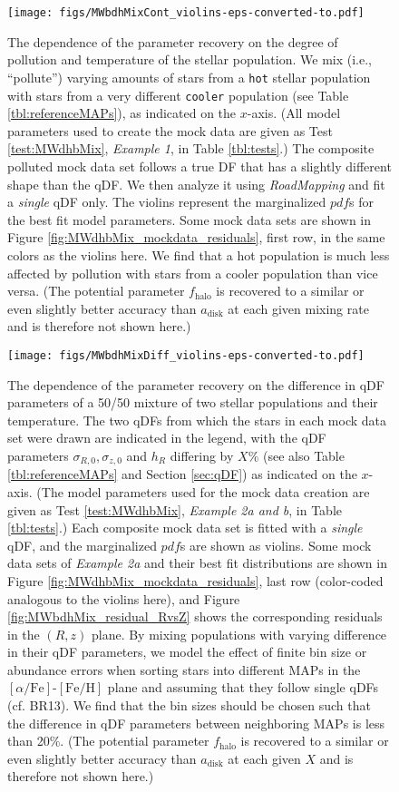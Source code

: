 \documentclass[iop,revtex4,numberedappendix,appendixfloats]{emulateapj}
\newcommand{\pdf}{\ensuremath{pdf}}
\newcommand{\MAPs}{MAPs}
\newcommand{\RM}{{\sl RoadMapping}}
\begin{document}
\begin{figure}[!htbp]
\centering
\texttt{[image: figs/MWbdhMixCont\_violins-eps-converted-to.pdf]}
\caption{The dependence of the parameter recovery on the degree of pollution and temperature of the stellar population. We mix (i.e., ``pollute'') varying amounts of stars from a \texttt{hot} stellar population with stars from a very different \texttt{cooler} population (see Table \ref{tbl:referenceMAPs}), as indicated on the $x$-axis. (All model parameters used to create the mock data are given as Test \ref{test:MWdhbMix}, \emph{Example 1}, in Table \ref{tbl:tests}.) The composite polluted mock data set follows a true DF that has a slightly different shape than the qDF. We then analyze it using \RM{} and fit a \emph{single} qDF only. The violins represent the marginalized \pdf{}s for the best fit model parameters. Some mock data sets are shown in Figure \ref{fig:MWdhbMix_mockdata_residuals}, first row, in the same colors as the violins here. We find that a hot population is much less affected by pollution with stars from a cooler population than vice versa. (The potential parameter $f_\text{halo}$ is recovered to a similar or even slightly better accuracy than $a_\text{disk}$ at each given mixing rate and is therefore not shown here.)}
\label{fig:MWdhbMixCont}
\end{figure}

\begin{figure}[!htbp]
\centering
\texttt{[image: figs/MWbdhMixDiff\_violins-eps-converted-to.pdf]}
\caption{The dependence of the parameter recovery on the difference in qDF parameters of a 50/50 mixture of two stellar populations and their temperature. The two qDFs from which the stars in each mock data set were drawn are indicated in the legend, with the qDF parameters $\sigma_{R,0}, \sigma_{z,0}$ and $h_R$ differing by $X\%$ (see also Table \ref{tbl:referenceMAPs} and Section \ref{sec:qDF}) as indicated on the $x$-axis. (The model parameters used for the mock data creation are given as Test \ref{test:MWdhbMix}, \emph{Example 2a and b}, in Table \ref{tbl:tests}.) Each composite mock data set is fitted with a \emph{single} qDF, and the marginalized \pdf{}s are shown as violins. Some mock data sets of \emph{Example 2a} and their best fit distributions are shown in Figure \ref{fig:MWdhbMix_mockdata_residuals}, last row (color-coded analogous to the violins here), and Figure \ref{fig:MWbdhMix_residual_RvsZ} shows the corresponding residuals in the $(R,z)$ plane. By mixing populations with varying difference in their qDF parameters, we model the effect of finite bin size or abundance errors when sorting stars into different \MAPs{} in the $[\alpha/\mathrm{Fe}]$-$[\mathrm{Fe}/\mathrm{H}]$ plane and assuming that they follow single qDFs (cf. BR13). We find that the bin sizes should be chosen such that the difference in qDF parameters between neighboring \MAPs{} is less than 20\%. (The potential parameter $f_\text{halo}$ is recovered to a similar or even slightly better accuracy than $a_\text{disk}$ at each given $X$ and is therefore not shown here.)} 
\label{fig:MWdhbMixDiff}
\end{figure}
\end{document}
